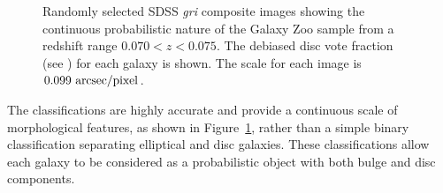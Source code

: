 \begin{figure}
\caption[Example SDSS images with GZ2 vote fractions]{Randomly selected SDSS \emph{gri} composite images showing the continuous probabilistic nature of the Galaxy Zoo sample from a redshift range $0.070 < z < 0.075$. The debiased disc vote fraction (see \citealt{GZ2}) for each galaxy is shown. The scale for each image is $0.099~\rm{arcsec/pixel}$.}
\label{mosaic}
\end{figure}

The classifications are highly accurate and provide a continuous scale of morphological features, as shown in Figure~\ref{mosaic}, rather than a simple binary classification separating elliptical and disc galaxies. These classifications allow each galaxy to be considered as a probabilistic object with both bulge and disc components. 
